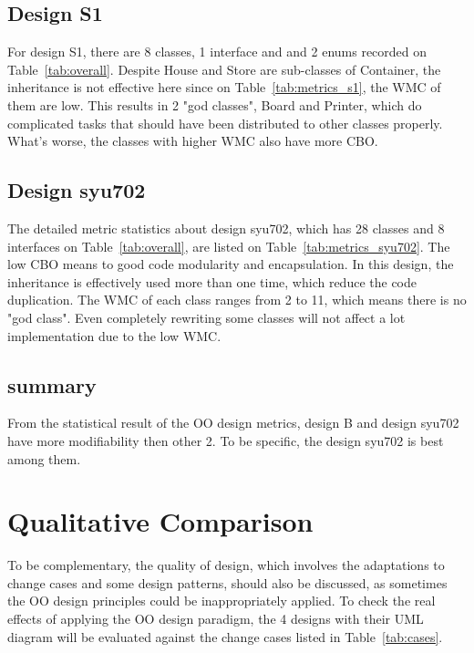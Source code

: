 \documentclass[conference]{IEEEtran}
\begin{document}
	\subsection{Design S1}
	
	For design S1, there are 8 classes, 1 interface and and 2 enums recorded on Table~\ref{tab:overall}. Despite House and Store are sub-classes of Container, the inheritance is not effective here since on Table~\ref{tab:metrics_s1}, the \gls{WMC} of them are low. This results in 2 "god classes", Board and Printer, which do complicated tasks that should have been distributed to other classes properly. What's worse, the classes with higher \gls{WMC} also have more \gls{CBO}.
	
	\subsection{Design syu702}
	
	The detailed metric statistics about design syu702, which has 28 classes and 8 interfaces on Table~\ref{tab:overall}, are listed on Table~\ref{tab:metrics_syu702}. The low \gls{CBO} means to good code modularity and encapsulation.  In this design, the inheritance is effectively used more than one time, which reduce the code duplication. The \gls{WMC} of each class ranges from 2 to 11, which means there is no "god class". Even completely rewriting some classes will not affect a lot implementation due to the low \gls{WMC}.
	
	\subsection{summary}
	From the statistical result of the \gls{OO} design metrics, design B and design syu702 have more modifiability then other 2. To be specific, the design syu702 is best among them.  
	 
	\section{Qualitative Comparison}
	To be complementary, the quality of design, which involves the adaptations to change cases and some design patterns, should also be discussed, as sometimes the \gls{OO} design principles could be inappropriately applied. To check the real effects of applying the \gls{OO} design paradigm, the 4 designs with their UML diagram will be evaluated against the change cases listed in Table~\ref{tab:cases}.
	
	
\end{document}
